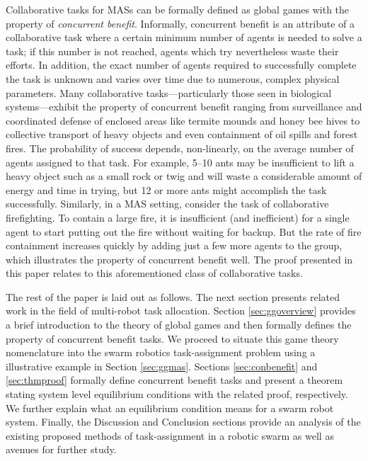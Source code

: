 \documentclass[conference]{ieeeconf}
\begin{document}
Collaborative tasks for MASs can be formally defined as global games with the property of \emph{concurrent benefit}. Informally, concurrent benefit is an attribute of a collaborative task where a certain minimum number of agents is needed to solve a task; if this number is not reached, agents which try nevertheless waste their efforts. In addition, the exact number of agents required to successfully complete the task is unknown and varies over time due to numerous, complex physical parameters. Many collaborative tasks---particularly those seen in biological systems---exhibit the property of concurrent benefit ranging from surveillance and coordinated defense of enclosed areas like termite mounds and honey bee hives \cite{Breed1990} to collective transport of heavy objects and even containment of oil spills and forest fires. The probability of success depends, non-linearly, on the average number of agents assigned to that task. For example, 5--10 ants may be insufficient to lift a heavy object such as a small rock or twig and will waste a considerable amount of energy and time in trying, but 12 or more ants might accomplish the task successfully. Similarly, in a MAS setting, consider the task of collaborative firefighting. To contain a large fire, it is insufficient (and inefficient) for a single agent to start putting out the fire without waiting for backup. But the rate of fire containment increases quickly by adding just a few more agents to the group, which illustrates the property of concurrent benefit well. The proof presented in this paper relates to this aforementioned class of collaborative tasks.

The rest of the paper is laid out as follows. The next section presents related work in the field of multi-robot task allocation. Section \ref{sec:ggoverview} provides a brief introduction to the theory of global games and then formally defines the property of concurrent benefit tasks. We proceed to situate this game theory nomenclature into the swarm robotics task-assignment problem using a illustrative example in Section \ref{sec:ggmas}. Sections \ref{sec:conbenefit} and \ref{sec:thmproof} formally define concurrent benefit tasks and present a theorem stating system level equilibrium conditions with the related proof, respectively. We further explain what an equilibrium condition means for a swarm robot system. Finally, the Discussion and Conclusion sections provide an analysis of the existing proposed methods of task-assignment in a robotic swarm as well as avenues for further study.
\end{document}
